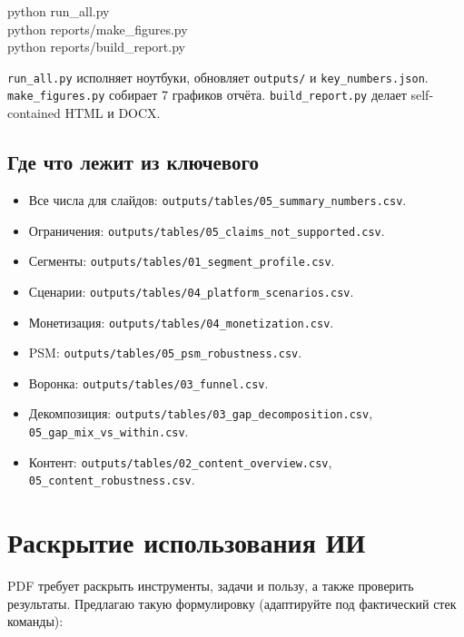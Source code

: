 \documentclass[10pt,a4paper]{article}
\begin{document}
\begin{flushleft}
\ttfamily\small
\begingroup\setlength{\parindent}{0pt}
python run\_all.py\\
python reports/make\_figures.py\\
python reports/build\_report.py\\
\endgroup
\end{flushleft}

\texttt{run\_all.py} исполняет ноутбуки, обновляет \texttt{outputs/} и \texttt{key\_numbers.json}. \texttt{make\_figures.py} собирает 7 графиков отчёта. \texttt{build\_report.py} делает self-contained HTML и DOCX.\par

\subsection{Где что лежит из ключевого}

\begin{itemize}[leftmargin=1.35em,itemsep=2pt,topsep=3pt,parsep=0pt]
\item Все числа для слайдов: \texttt{outputs/tables/05\_summary\_numbers.csv}.
\item Ограничения: \texttt{outputs/tables/05\_claims\_not\_supported.csv}.
\item Сегменты: \texttt{outputs/tables/01\_segment\_profile.csv}.
\item Сценарии: \texttt{outputs/tables/04\_platform\_scenarios.csv}.
\item Монетизация: \texttt{outputs/tables/04\_monetization.csv}.
\item PSM: \texttt{outputs/tables/05\_psm\_robustness.csv}.
\item Воронка: \texttt{outputs/tables/03\_funnel.csv}.
\item Декомпозиция: \texttt{outputs/tables/03\_gap\_decomposition.csv}, \texttt{05\_gap\_mix\_vs\_within.csv}.
\item Контент: \texttt{outputs/tables/02\_content\_overview.csv}, \texttt{05\_content\_robustness.csv}.
\end{itemize}

\clearpage

\section{Раскрытие использования ИИ}

PDF требует раскрыть инструменты, задачи и пользу, а также проверить результаты. Предлагаю такую формулировку (адаптируйте под фактический стек команды):\par
\end{document}
